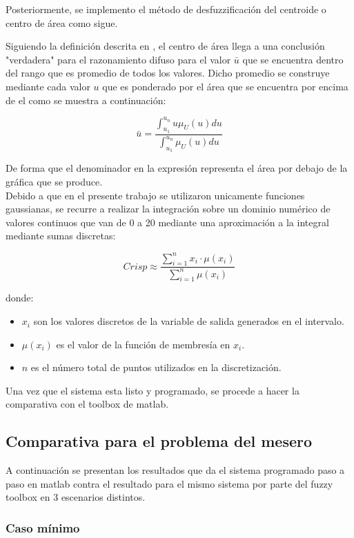 \documentclass[11pt, letterpaper]{article}
\begin{document}
\newpage

Posteriormente, se implemento el método de desfuzzificación del centroide o centro de área como sigue.

Siguiendo la definición descrita en \cite{Cisneros2004}, el centro de área llega a una conclusión "verdadera" para el razonamiento difuso para el valor $\bar{u}$ que se encuentra dentro del rango que es promedio de todos los valores. Dicho promedio se construye mediante cada valor $u$ que es ponderado por el área que se encuentra por encima de el como se muestra a continuación:


$$\bar{u} = \frac{\int_{u_1}^{u_n}u\mu_{U}(u)du}{\int_{u_1}^{u_n}\mu_{U}(u)du}$$

De forma que el denominador en la expresión representa el área por debajo de la gráfica que se produce.\\

Debido a que en el presente trabajo se utilizaron unicamente funciones gaussianas, se recurre a realizar la integración sobre un dominio numérico de valores continuos que van de 0 a 20 mediante una aproximación a la integral mediante sumas discretas:

$$Crisp \approx \frac{\sum_{i=1}^{n} x_i \cdot \mu(x_i)}{\sum_{i=1}^{n} \mu(x_i)}$$

donde:

\begin{itemize}
	\item \( x_i \) son los valores discretos de la variable de salida generados en el intervalo.
	\item \( \mu(x_i) \) es el valor de la función de membresía en \( x_i \).
	\item \( n \) es el número total de puntos utilizados en la discretización.
\end{itemize}


Una vez que el sistema esta listo y programado, se procede a hacer la comparativa con el toolbox de matlab.

\newpage

\subsection{Comparativa para el problema del mesero}


A continuación se presentan los resultados que da el sistema programado paso a paso en matlab contra el resultado para el mismo sistema por parte del fuzzy toolbox en 3 escenarios distintos.

\subsubsection{Caso mínimo}
\end{document}
